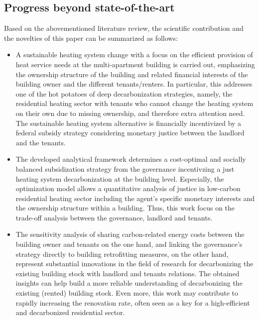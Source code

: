 \subsection{Progress beyond state-of-the-art}\label{novelties}
Based on the abovementioned literature review, the scientific contribution and the novelties of this paper can be summarized as follows:
\begin{itemize}
	\item A sustainable heating system change with a focus on the efficient provision of heat service needs at the multi-apartment building is carried out, emphasizing the ownership structure of the building and related financial interests of the building owner and the different tenants/renters. In particular, this addresses one of the hot potatoes of deep decarbonization strategies, namely, the residential heating sector with tenants who cannot change the heating system on their own due to missing ownership, and therefore extra attention need. The sustainable heating system alternative is financially incentivized by a federal subsidy strategy considering monetary justice between the landlord and the tenants. 
	\item The developed analytical framework determines a cost-optimal and socially balanced subsidization strategy from the governance incentivzing a just heating system decarbonization at the building level. Especially, the optimization model allows a quantitative analysis of justice in low-carbon residential heating sector including the agent's specific monetary interests and the ownership structure within a building. Thus, this work focus on the trade-off analysis between the governance, landlord and tenants.
	\item The sensitivity analysis of sharing carbon-related energy costs between the building owner and tenants on the one hand, and linking the governance's strategy directly to building retrofitting measures, on the other hand, represent substantial innovations in the field of research for decarbonizing the existing building stock with landlord and tenants relations. The obtained insights can help build a more reliable understanding of decarbonizing the existing (rented) building stock. Even more, this work may contribute to rapidly increasing the renovation rate, often seen as a key for a high-efficient and decarbonized residential sector. 
\end{itemize}